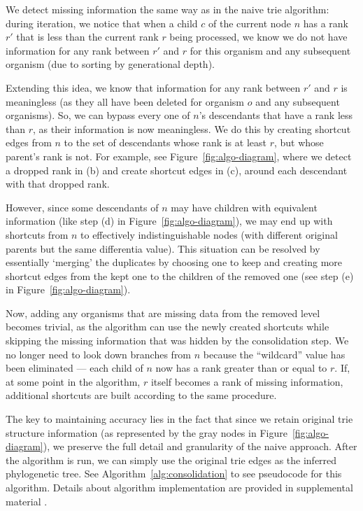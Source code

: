 We detect missing information the same way as in the naive trie algorithm: during iteration, we notice that when a child $c$ of the current node $n$ has a rank $r'$ that is less than the current rank $r$ being processed, we know we do not have information for any rank between $r'$ and $r$ for this organism and any subsequent organism (due to sorting by generational depth).

Extending this idea, we know that information for any rank between $r'$ and $r$ is meaningless (as they all have been deleted for organism $o$ and any subsequent organisms). 
So, we can bypass every one of $n$'s descendants that have a rank less than $r$, as their information is now meaningless.
We do this by creating shortcut edges from $n$ to the set of descendants whose rank is at least $r$, but whose parent's rank is not.
For example, see Figure~\ref{fig:algo-diagram}, where we detect a dropped rank in (b) and create shortcut edges in (c), around each descendant with that dropped rank.

However, since some descendants of $n$ may have children with equivalent information (like step (d) in Figure~\ref{fig:algo-diagram}), we may end up with shortcuts from $n$ to effectively indistinguishable nodes (with different original parents but the same differentia value).
This situation can be resolved by essentially `merging' the duplicates by choosing one to keep and creating more shortcut edges from the kept one to the children of the removed one (see step (e) in Figure~\ref{fig:algo-diagram}).

Now, adding any organisms that are missing data from the removed level becomes trivial, as the algorithm can use the newly created shortcuts while skipping the missing information that was hidden by the consolidation step.
We no longer need to look down branches from $n$ because the ``wildcard'' value has been eliminated --- each child of $n$ now has a rank greater than or equal to $r$.
If, at some point in the algorithm, $r$ itself becomes a rank of missing information, additional shortcuts are built according to the same procedure.



The key to maintaining accuracy lies in the fact that since we retain original trie structure information (as represented by the gray nodes in Figure~\ref{fig:algo-diagram}), we preserve the full detail and granularity of the naive approach.
After the algorithm is run, we can simply use the original trie edges as the inferred phylogenetic tree.
See Algorithm~\ref{alg:consolidation} to see pseudocode for this algorithm.
Details about algorithm implementation are provided in supplemental material \citep{supplemental}.
